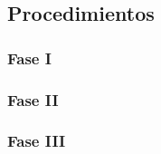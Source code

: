 \subsection{Procedimientos}
%
\subsubsection{Fase I} %
%
\subsubsection{Fase II} %
%
\subsubsection{Fase III} %
%
